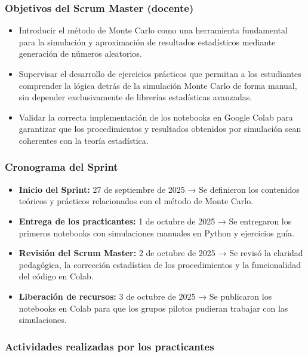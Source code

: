 \documentclass[letter,oneside,12pt,spanish]{report}
\begin{document}
\subsubsection*{Objetivos del Scrum Master (docente)}
\begin{itemize}
	\item Introducir el método de Monte Carlo como una herramienta fundamental para la simulación y aproximación de resultados estadísticos mediante generación de números aleatorios.
	\item Supervisar el desarrollo de ejercicios prácticos que permitan a los estudiantes comprender la lógica detrás de la simulación Monte Carlo de forma manual, sin depender exclusivamente de librerías estadísticas avanzadas.
	\item Validar la correcta implementación de los notebooks en Google Colab para garantizar que los procedimientos y resultados obtenidos por simulación sean coherentes con la teoría estadística.
\end{itemize}

\subsubsection*{Cronograma del Sprint}
\begin{itemize}
	\item \textbf{Inicio del Sprint:} 27 de septiembre de 2025 → Se definieron los contenidos teóricos y prácticos relacionados con el método de Monte Carlo.
	\item \textbf{Entrega de los practicantes:} 1 de octubre de 2025 → Se entregaron los primeros notebooks con simulaciones manuales en Python y ejercicios guía.
	\item \textbf{Revisión del Scrum Master:} 2 de octubre de 2025 → Se revisó la claridad pedagógica, la corrección estadística de los procedimientos y la funcionalidad del código en Colab.
	\item \textbf{Liberación de recursos:} 3 de octubre de 2025 → Se publicaron los notebooks en Colab para que los grupos pilotos pudieran trabajar con las simulaciones.
\end{itemize}

\subsubsection*{Actividades realizadas por los practicantes}
\end{document}
